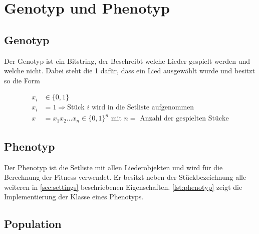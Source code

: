 \section{Genotyp und Phenotyp}\label{sec:genotypPhenotyp}
\subsection{Genotyp}
Der Genotyp ist ein Bitstring, der Beschreibt welche Lieder gespielt werden und welche nicht.
Dabei steht die 1 dafür, dass ein Lied ausgewählt wurde und besitzt so die Form

\begin{equation}
    \label{eqn:genotyp}
    \begin{split}
        x_i &\in \{ 0,1 \} \\
        x_i &= 1 \Rightarrow \text{Stück $i$ wird in die Setliste aufgenommen} \\
        x   &= x_1x_2...x_n \in \{0,1\}^n\text{ mit $n = $ Anzahl der gespielten Stücke}
    \end{split}
\end{equation}

\subsection{Phenotyp}
Der Phenotyp ist die Setliste mit allen Liederobjekten und wird für die
Berechnung der Fitness verwendet.
Er besitzt neben der Stückbezeichnung alle weiteren in \autoref{sec:settings}
beschriebenen Eigenschaften. \autoref{lst:phenotyp} zeigt die Implementierung der Klasse
eines Phenotyps.



\subsection{Population}